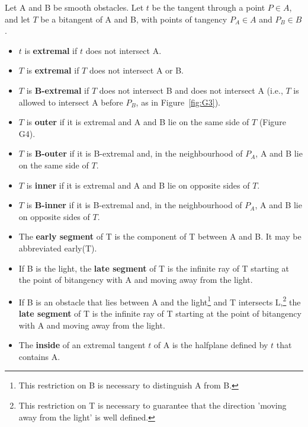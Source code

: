 \documentclass[12pt]{article}
\begin{document}
\begin{defn2}
\label{defn:outer}
Let A and B be smooth obstacles.
Let $t$ be the tangent through a point $P \in A$,
and let $T$ be a bitangent of A and B, with points of tangency $P_A \in A$ and 
$P_B \in B$.

\begin{itemize}
\item $t$ is {\bf extremal} if $t$ does not intersect A.
\item $T$ is {\bf extremal} if $T$ does not intersect A or B.
\item $T$ is {\bf B-extremal} if $T$ does not intersect B
	and  does not intersect A
	(i.e., $T$ is allowed to intersect A before $P_B$, as in Figure~\ref{fig:G3}).
\item $T$ is {\bf outer} if it is extremal and 
A and B lie on the same side of $T$ (Figure G4).
\item $T$ is {\bf B-outer} if it is B-extremal and, in the neighbourhood of $P_A$,  
A and B lie on the same side of $T$.
\item $T$ is {\bf inner} if it is extremal and
A and B lie on opposite sides of $T$.
\item $T$ is {\bf B-inner} if it is B-extremal and, in the neighbourhood of $P_A$,
A and B lie on opposite sides of $T$.
\item
The {\bf early segment} of T is the component of T between A and B.
It may be abbreviated early(T).
\item 
If B is the light,
the {\bf late segment} of T is the infinite ray of T starting at
the point of bitangency with A and moving away from the light.
\item
If B is an obstacle that lies between A and the light\footnote{This 
	restriction on B is necessary to distinguish A from B.}
and T intersects L,\footnote{This restriction on T is necessary
	to guarantee that the direction 'moving away from the light'
	is well defined.}
the {\bf late segment} of T is the infinite ray of T starting at the point
of bitangency with A and moving away from the light.
\item
The {\bf inside} of an extremal tangent $t$ of A is
the halfplane defined by $t$ that contains A.
\end{itemize}
\end{defn2}

\end{document}
